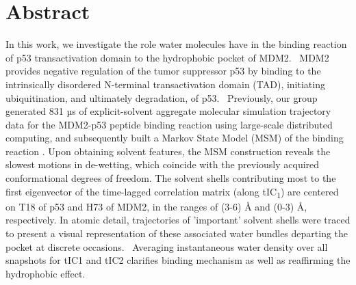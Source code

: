 
\section{Abstract}

In this work, we investigate the role water molecules have in the
binding reaction of p53 transactivation domain to the hydrophobic pocket
of MDM2.~ MDM2 provides negative regulation of the tumor suppressor p53
by binding to the intrinsically disordered N-terminal transactivation
domain (TAD), initiating ubiquitination, and ultimately degradation, of
p53.~ Previously, our group generated 831 µs of explicit-solvent
aggregate molecular simulation trajectory data for the MDM2-p53 peptide
binding reaction using large-scale distributed computing, and
subsequently built a Markov State Model (MSM) of the binding reaction \cite{zhou2017bridging}.
 Upon obtaining solvent features, the MSM construction reveals the
slowest motions in de-wetting, which coincide with the previously
acquired conformational degrees of freedom. The solvent shells
contributing most to the first eigenvector of the time-lagged
correlation matrix (along tIC\textsubscript{1}) are centered on T18 of
p53 and H73 of MDM2, in the ranges of (3-6) Å and (0-3) Å, respectively.
In atomic detail, trajectories of 'important' solvent shells were traced
to present a visual representation of these associated water bundles
departing the pocket at discrete occasions.~ Averaging instantaneous
water density over all snapshots for tIC1 and tIC2 clarifies binding
mechanism as well as reaffirming the hydrophobic effect.

